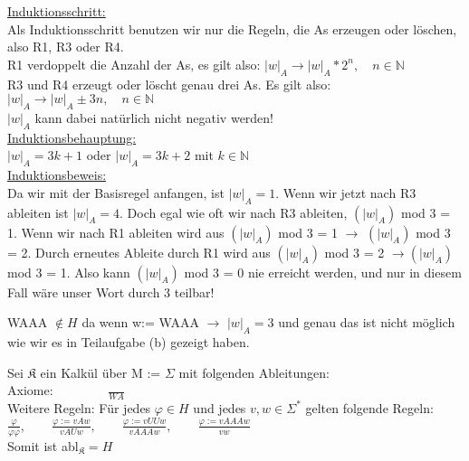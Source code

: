 \documentclass[a4paper,10pt]{article}
\begin{document}
\begin{compactenum} [(a)]
		\underline{Induktionsschritt:}\\
		Als Induktionsschritt benutzen wir nur die Regeln, die As erzeugen oder löschen, also R1, R3 oder R4. \\
		R1 verdoppelt die Anzahl der As, es gilt also: $ |w|_A \longrightarrow |w|_A * 2^n, \quad n \in \mathbb{N}$\\
		R3 und R4 erzeugt oder löscht genau drei As. Es gilt also:  $ |w|_A \longrightarrow |w|_A \pm 3n, \quad n \in \mathbb{N}$\\
		$ |w|_A $ kann dabei natürlich nicht negativ werden!\\

		\underline{Induktionsbehauptung:} \\
		$ |w|_A = 3k+1$ oder $ |w|_A = 3k+2$ mit $ k \in \mathbb{N} $\\
		
		\underline{Induktionsbeweis:}\\
		Da wir mit der Basisregel anfangen, ist  $ |w|_A = 1 $. Wenn wir jetzt nach R3 ableiten ist $ |w|_A = 4 $. Doch egal wie oft wir nach R3 ableiten, $ (|w|_A)$ mod 3 = 1. Wenn wir nach R1 ableiten wird aus $ (|w|_A)$ mod 3 = 1 $ \longrightarrow $ $ (|w|_A)$ mod 3 = 2. Durch erneutes Ableite durch R1 wird aus $(|w|_A)$ mod 3 = 2 $ \longrightarrow (|w|_A)$ mod 3 = 1. Also kann $(|w|_A)$ mod 3 = 0 nie erreicht werden, und nur in diesem Fall wäre unser Wort durch 3 teilbar!\\
		
	\item WAAA $ \not\in H $ da wenn w:= WAAA $ \rightarrow $ $ |w|_A = 3 $ und genau das ist nicht möglich wie wir es in Teilaufgabe (b) gezeigt haben.\\
	
	\item Sei $ \mathfrak{K} $ ein Kalkül über M := $ \Sigma $ mit folgenden Ableitungen:\\
	Axiome: $ \qquad \qquad \frac{}{WA} $\\
	
	Weitere Regeln: Für jedes $ \varphi \in H $ und jedes $ v,w \in \Sigma^* $ gelten folgende Regeln:\\
	
	$ \frac{\varphi}{\varphi \varphi},\qquad \frac{\varphi:= vAw}{vAUw},\qquad \frac{\varphi:=vUUw}{vAAAw},\qquad \frac{\varphi:= vAAAw}{vw} $\\
	
	Somit ist abl$_\mathfrak{K} = H$
	\end{compactenum}\ \\
	
\end{document}
